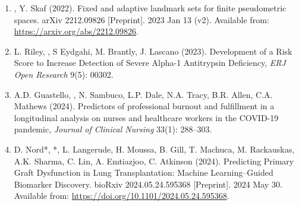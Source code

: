 \documentclass{nihbiosketch}
\begin{document}
\begin{enumerate}
\begin{enumerate}
\item {}, Y. Skaf (2022). Fixed and adaptive landmark sets for finite pseudometric spaces. arXiv 2212.09826 [Preprint]. 2023 Jan 13 (v2).  Available from: \url{https://arxiv.org/abs/2212.09826}.
\item L. Riley, , S Eydgahi, M. Brantly, J. Lascano (2023). Development of a Risk Score to Increase Detection of Severe Alpha-1 Antitrypsin Deficiency, \emph{ERJ Open Research} 9(5): 00302.
\item A.D. Guastello, , N. Sambuco, L.P. Dale, N.A. Tracy, B.R. Allen, C.A. Mathews (2024). Predictors of professional burnout and fulfillment in a longitudinal analysis on nurses and healthcare workers in the COVID-19 pandemic, \emph{Journal of Clinical Nursing} 33(1): 288--303.
\item D. Nord*, *, L. Langerude, H. Moussa, B. Gill, T. Machuca, M. Rackauskas, A.K. Sharma, C. Lin, A. Emtiazjoo, C. Atkinson (2024). Predicting Primary Graft Dysfunction in Lung Transplantation: Machine Learning--Guided Biomarker Discovery. bioRxiv 2024.05.24.595368 [Preprint]. 2024 May 30. Available from: \url{https://doi.org/10.1101/2024.05.24.595368}.
\end{enumerate}


\end{enumerate}
\end{document}
